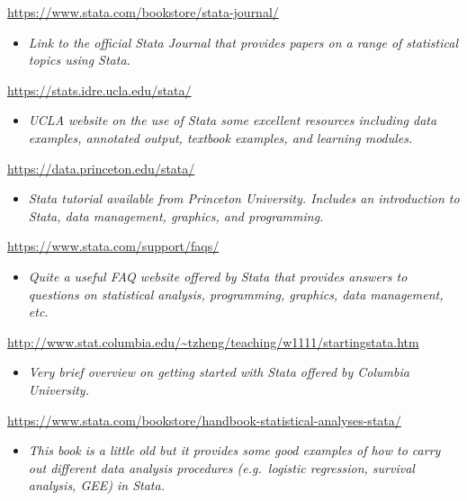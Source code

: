 \documentclass[
]{book}
\providecommand{\tightlist}{%
  \setlength{\itemsep}{0pt}\setlength{\parskip}{0pt}}
\begin{document}
\url{https://www.stata.com/bookstore/stata-journal/}

\begin{itemize}
\tightlist
\item
  \emph{Link to the official Stata Journal that provides papers on a range of statistical topics using Stata.}
\end{itemize}

\url{https://stats.idre.ucla.edu/stata/}

\begin{itemize}
\tightlist
\item
  \emph{UCLA website on the use of Stata some excellent resources including data examples, annotated output, textbook examples, and learning modules.}
\end{itemize}

\url{https://data.princeton.edu/stata/}

\begin{itemize}
\tightlist
\item
  \emph{Stata tutorial available from Princeton University. Includes an introduction to Stata, data management, graphics, and programming.}
\end{itemize}

\url{https://www.stata.com/support/faqs/}

\begin{itemize}
\tightlist
\item
  \emph{Quite a useful FAQ website offered by Stata that provides answers to questions on statistical analysis, programming, graphics, data management, etc.}
\end{itemize}

\url{http://www.stat.columbia.edu/~tzheng/teaching/w1111/startingstata.htm}

\begin{itemize}
\tightlist
\item
  \emph{Very brief overview on getting started with Stata offered by Columbia University.}
\end{itemize}

\url{https://www.stata.com/bookstore/handbook-statistical-analyses-stata/}

\begin{itemize}
\tightlist
\item
  \emph{This book is a little old but it provides some good examples of how to carry out different data analysis procedures (e.g.~logistic regression, survival analysis, GEE) in Stata.}
\end{itemize}
\end{document}
